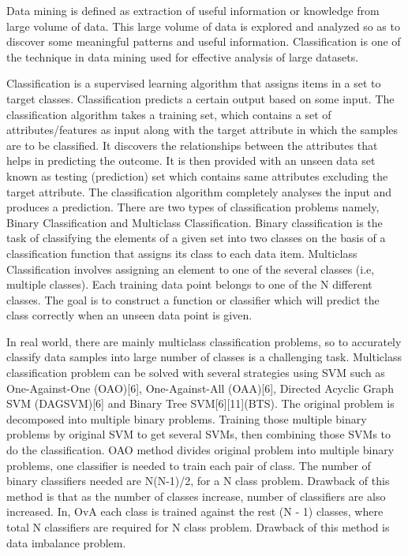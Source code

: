 \documentclass[a4paper, 10pt, conference]{ieeeconf}      %
\begin{document}
Data mining is defined as extraction of useful information or knowledge from large volume of data. This large volume of data is explored and analyzed so as to discover some meaningful patterns and useful information. Classification is one of the technique in data mining used for effective analysis of large datasets.
\par
Classification is a supervised learning algorithm that assigns items in a set to target classes. Classification predicts a certain output based on some input. The classification algorithm takes a training set, which contains a set of attributes/features as input along with the target attribute in which the samples are to be classified. It discovers the relationships between the attributes that helps in predicting the outcome. It is then provided with an unseen data set known as testing (prediction) set which contains same attributes excluding the target attribute. The classification algorithm completely analyses the input and produces a prediction. There are two types of classification problems namely, Binary Classification and Multiclass Classification.
Binary classification is the task of classifying the elements of a given set into two classes on the basis of a classification function that assigns its class to each data item. Multiclass Classification involves assigning an element to one of the several classes (i.e, multiple classes). Each training data point belongs to one of the N different classes. The goal is to construct a function or classifier which will predict the class correctly when an unseen data point is given.
\par
In real world, there are mainly multiclass classification problems, so to accurately classify data samples into large number of classes is a challenging task. Multiclass classification problem can be solved with several strategies using SVM such as One-Against-One (OAO)[6], One-Against-All (OAA)[6], Directed Acyclic Graph SVM (DAGSVM)[6] and Binary Tree SVM[6][11](BTS). The original problem is decomposed into multiple binary problems. Training those multiple binary problems by original SVM to get several SVMs, then combining those SVMs to do the classification. OAO method divides original problem into multiple binary problems, one classifier is needed to train each pair of class. The number of binary classifiers needed are N(N-1)/2, for a N class problem. Drawback of this method is that as the number of classes increase, number of classifiers are also increased. In, OvA each class is trained against the rest (N - 1) classes, where total N classifiers are required for N class problem. Drawback of this method is data imbalance problem.
\end{document}
